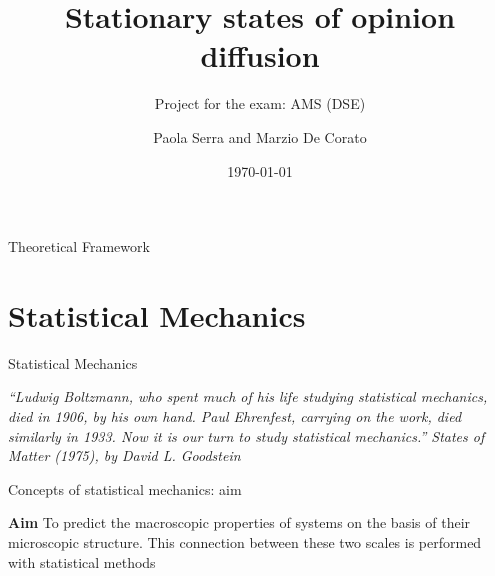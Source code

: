 \documentclass{beamer}
\title[AMS project]{ Stationary states of opinion diffusion}
\subtitle{Project for the exam: AMS (DSE)}
\author{Paola Serra and Marzio De Corato }
\date{\today}
\begin{document}
\begin{frame}
\vspace{+4 cm}  \titlepage
\end{frame}

\usebackgroundtemplate{ } 






\begin{frame}{}
\begin{center}
{\Huge Theoretical Framework}
\end{center}
\end{frame}


\section{Statistical Mechanics}

\begin{frame}{}
\begin{center}
{\Huge Statistical Mechanics}
\end{center}
\begin{center}
\textit{“Ludwig Boltzmann, who spent much of his life studying statistical mechanics, died in 1906, by his own hand. Paul Ehrenfest, carrying on the work, died similarly in 1933. Now it is our turn to study statistical mechanics.” States of Matter (1975), by David L. Goodstein}
\end{center}
\end{frame}

\begin{frame}{Concepts of statistical mechanics: aim \cite{peliti2011statistical}}
\begin{center}
\textbf{Aim} To predict the macroscopic properties of systems on the basis of their microscopic structure. This connection between these two scales is performed with statistical methods
\end{center}
\end{frame}
\end{document}
